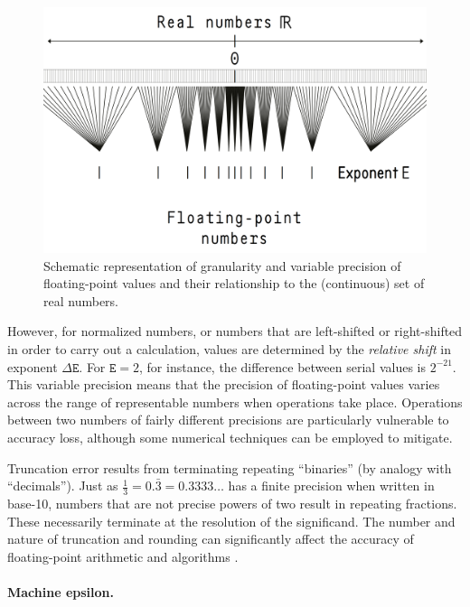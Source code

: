 \documentclass[twoside]{article}
\begin{document}
\begin{figure}[htb]
\includegraphics[width=\textwidth]{img/fp-res}
\caption{Schematic representation of granularity and variable precision of floating-point values and their relationship to the (continuous) set of real numbers.}
\label{fig:fp-res}
\end{figure}

However, for normalized numbers, or numbers that are left-shifted or right-shifted in order to carry out a calculation, values are determined by the \emph{relative shift} in exponent $\Delta\mathtt{E}$.  For $\mathtt{E} = 2$, for instance, the difference between serial values is $2^{-21}$.  This variable precision means that the precision of floating-point values varies across the range of representable numbers when operations take place.  Operations between two numbers of fairly different precisions are particularly vulnerable to accuracy loss, although some numerical techniques can be employed to mitigate.

Truncation error results from terminating repeating “binaries” (by analogy with “decimals”).  Just as $\frac{1}{3} = 0.\bar{3} = 0.3333…$ has a finite precision when written in base-10, numbers that are not precise powers of two result in repeating fractions.  These necessarily terminate at the resolution of the significand.  The number and nature of truncation and rounding can significantly affect the accuracy of floating-point arithmetic and algorithms \citep{Izquierdo2006}.
 
\paragraph{Machine epsilon.}
\end{document}
